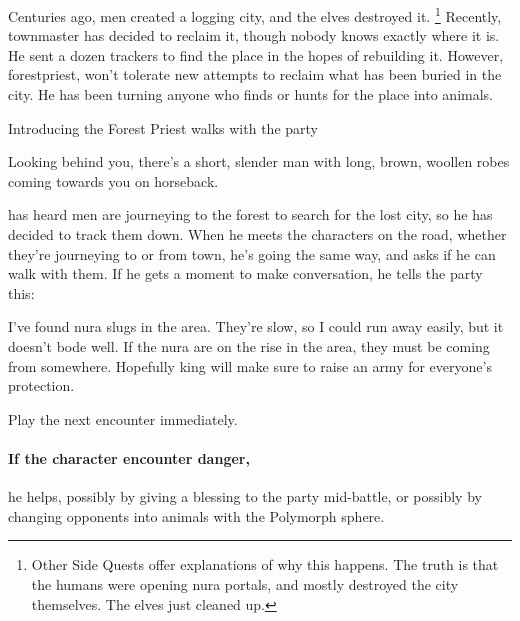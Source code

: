 \begin{multicols}{2}

\resumecontents[Town]
\resumecontents[Forest]

\label{herenofarther}

\stopcontents[Town]
\stopcontents[Forest]

\startcontents[sq]

\sqminitoc

Centuries ago, men created a logging city, and the elves destroyed it.
\footnote{Other Side Quests offer explanations of why this happens.
The truth is that the humans were opening nura portals, and mostly destroyed the city themselves.
The elves just cleaned up.} 
Recently, \gls{townmaster} has decided to reclaim it, though nobody knows exactly where it is.
He sent a dozen trackers to find the place in the hopes of rebuilding it.
However, \gls{forestpriest}, won't tolerate new attempts to reclaim what has been buried in the city.
He has been turning anyone who finds or hunts for the place into animals.

{Introducing the Forest Priest}%
{ walks with the party}%

\begin{boxtext}

	Looking behind you, there's a short, slender man with long, brown, woollen robes coming towards you on horseback.

\end{boxtext}

 has heard men are journeying to the forest to search for the lost city, so he has decided to track them down.
When he meets the characters on the road, whether they're journeying to or from town, he's going the same way, and asks if he can walk with them.
If he gets a moment to make conversation, he tells the party this:

\begin{speechtext}

	I've found nura slugs in the area.
	They're slow, so I could run away easily, but it doesn't bode well.
	If the nura are on the rise in the area, they must be coming from somewhere.
	Hopefully \gls{king} will make sure to raise an army for everyone's protection.

\end{speechtext}

Play the next encounter immediately.
\paragraph{If the character encounter danger,}
he helps, possibly by giving a blessing to the party mid-battle, or possibly by changing opponents into animals with the Polymorph sphere.


\end{multicols}
